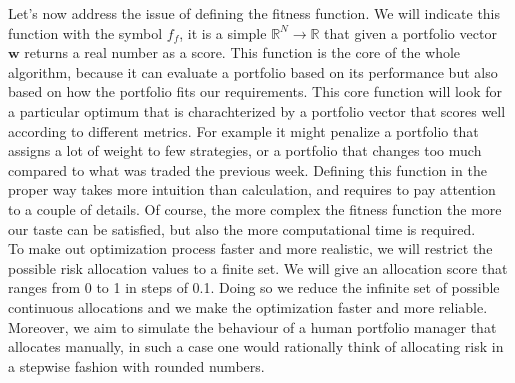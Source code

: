 Let's now address the issue of defining the fitness function. We will indicate this function with the symbol $f_f$, it is a simple $\mathbb{R}^N \rightarrow \mathbb{R}$ that given a portfolio vector $\mathbf{w}$ returns a real number as a score. This function is the core of the whole algorithm, because it can evaluate a portfolio based on its performance but also based on how the portfolio fits our requirements. This core function will look for a particular optimum that is charachterized by a portfolio vector that scores well according to different metrics. For example it might penalize a portfolio that assigns a lot of weight to few strategies, or a portfolio that changes too much compared to what was traded the previous week. Defining this function in the proper way takes more intuition than calculation, and requires to pay attention to a couple of details. Of course, the more complex the fitness function the more our taste can be satisfied, but also the more computational time is required.\\
To make out optimization process faster and more realistic, we will restrict the possible risk allocation values to a finite set. We will give an allocation score that ranges from 0 to 1 in steps of 0.1. Doing so we reduce the infinite set of possible continuous allocations and we make the optimization faster and more reliable. Moreover, we aim to simulate the behaviour of a human portfolio manager that allocates manually, in such a case one would rationally think of allocating risk in a stepwise fashion with rounded numbers.\\ 

\\
\\